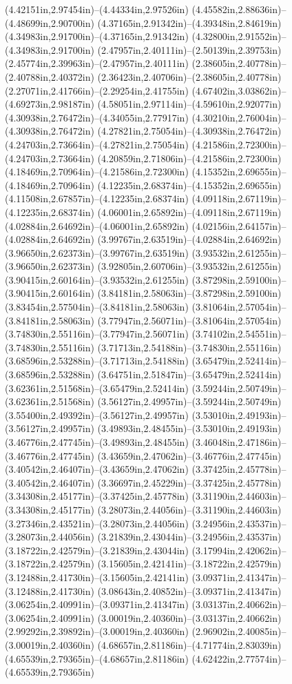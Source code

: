 (4.42151in,2.97454in)--(4.44334in,2.97526in) (4.45582in,2.88636in)--(4.48699in,2.90700in) (4.37165in,2.91342in)--(4.39348in,2.84619in) (4.34983in,2.91700in)--(4.37165in,2.91342in) (4.32800in,2.91552in)--(4.34983in,2.91700in) (2.47957in,2.40111in)--(2.50139in,2.39753in) (2.45774in,2.39963in)--(2.47957in,2.40111in) (2.38605in,2.40778in)--(2.40788in,2.40372in) (2.36423in,2.40706in)--(2.38605in,2.40778in) (2.27071in,2.41766in)--(2.29254in,2.41755in) (4.67402in,3.03862in)--(4.69273in,2.98187in) (4.58051in,2.97114in)--(4.59610in,2.92077in) (4.30938in,2.76472in)--(4.34055in,2.77917in) (4.30210in,2.76004in)--(4.30938in,2.76472in) (4.27821in,2.75054in)--(4.30938in,2.76472in) (4.24703in,2.73664in)--(4.27821in,2.75054in) (4.21586in,2.72300in)--(4.24703in,2.73664in) (4.20859in,2.71806in)--(4.21586in,2.72300in) (4.18469in,2.70964in)--(4.21586in,2.72300in) (4.15352in,2.69655in)--(4.18469in,2.70964in) (4.12235in,2.68374in)--(4.15352in,2.69655in) (4.11508in,2.67857in)--(4.12235in,2.68374in) (4.09118in,2.67119in)--(4.12235in,2.68374in) (4.06001in,2.65892in)--(4.09118in,2.67119in) (4.02884in,2.64692in)--(4.06001in,2.65892in) (4.02156in,2.64157in)--(4.02884in,2.64692in) (3.99767in,2.63519in)--(4.02884in,2.64692in) (3.96650in,2.62373in)--(3.99767in,2.63519in) (3.93532in,2.61255in)--(3.96650in,2.62373in) (3.92805in,2.60706in)--(3.93532in,2.61255in) (3.90415in,2.60164in)--(3.93532in,2.61255in) (3.87298in,2.59100in)--(3.90415in,2.60164in) (3.84181in,2.58063in)--(3.87298in,2.59100in) (3.83454in,2.57504in)--(3.84181in,2.58063in) (3.81064in,2.57054in)--(3.84181in,2.58063in) (3.77947in,2.56071in)--(3.81064in,2.57054in) (3.74830in,2.55116in)--(3.77947in,2.56071in) (3.74102in,2.54551in)--(3.74830in,2.55116in) (3.71713in,2.54188in)--(3.74830in,2.55116in) (3.68596in,2.53288in)--(3.71713in,2.54188in) (3.65479in,2.52414in)--(3.68596in,2.53288in) (3.64751in,2.51847in)--(3.65479in,2.52414in) (3.62361in,2.51568in)--(3.65479in,2.52414in) (3.59244in,2.50749in)--(3.62361in,2.51568in) (3.56127in,2.49957in)--(3.59244in,2.50749in) (3.55400in,2.49392in)--(3.56127in,2.49957in) (3.53010in,2.49193in)--(3.56127in,2.49957in) (3.49893in,2.48455in)--(3.53010in,2.49193in) (3.46776in,2.47745in)--(3.49893in,2.48455in) (3.46048in,2.47186in)--(3.46776in,2.47745in) (3.43659in,2.47062in)--(3.46776in,2.47745in) (3.40542in,2.46407in)--(3.43659in,2.47062in) (3.37425in,2.45778in)--(3.40542in,2.46407in) (3.36697in,2.45229in)--(3.37425in,2.45778in) (3.34308in,2.45177in)--(3.37425in,2.45778in) (3.31190in,2.44603in)--(3.34308in,2.45177in) (3.28073in,2.44056in)--(3.31190in,2.44603in) (3.27346in,2.43521in)--(3.28073in,2.44056in) (3.24956in,2.43537in)--(3.28073in,2.44056in) (3.21839in,2.43044in)--(3.24956in,2.43537in) (3.18722in,2.42579in)--(3.21839in,2.43044in) (3.17994in,2.42062in)--(3.18722in,2.42579in) (3.15605in,2.42141in)--(3.18722in,2.42579in) (3.12488in,2.41730in)--(3.15605in,2.42141in) (3.09371in,2.41347in)--(3.12488in,2.41730in) (3.08643in,2.40852in)--(3.09371in,2.41347in) (3.06254in,2.40991in)--(3.09371in,2.41347in) (3.03137in,2.40662in)--(3.06254in,2.40991in) (3.00019in,2.40360in)--(3.03137in,2.40662in) (2.99292in,2.39892in)--(3.00019in,2.40360in) (2.96902in,2.40085in)--(3.00019in,2.40360in) (4.68657in,2.81186in)--(4.71774in,2.83039in) (4.65539in,2.79365in)--(4.68657in,2.81186in) (4.62422in,2.77574in)--(4.65539in,2.79365in) 